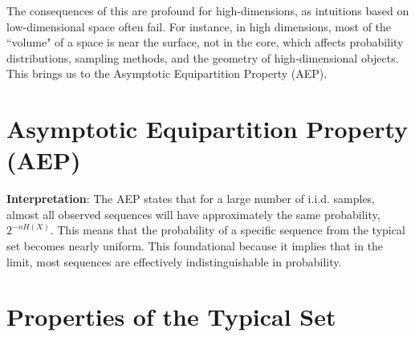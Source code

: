 The consequences of this are profound for high-dimensions, as intuitions based on low-dimensional space often fail. For instance, in high dimensions, most of the ``volume" of a space is near the surface, not in the core, which affects probability distributions, sampling methods, and the geometry of high-dimensional objects. This brings us to the Asymptotic Equipartition Property (AEP).


\section{Asymptotic Equipartition Property (AEP)}


\textbf{Interpretation}: The AEP states that for a large number of i.i.d. samples, almost all observed sequences will have approximately the same probability, $2^{-nH(X)}$. This means that the probability of a specific sequence from the typical set becomes nearly uniform. This foundational because it implies that in the limit, most sequences are effectively indistinguishable in probability.

\section{Properties of the Typical Set}

